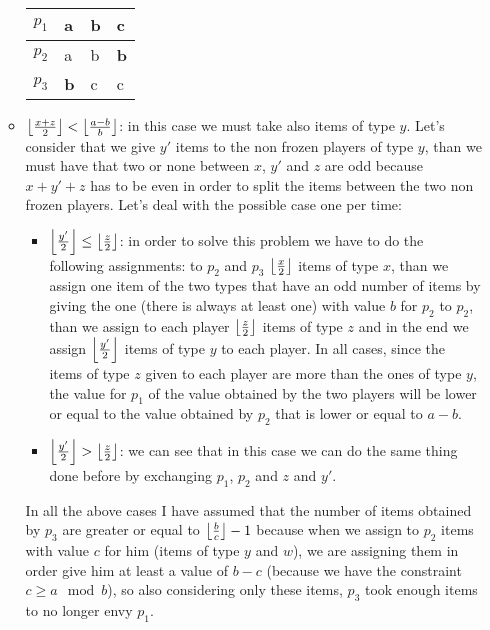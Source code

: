 \begin{itemize}
\begin{itemize}
         \begin{table}[h]
            \centering
                \begin{tabular}{|l|l|l|l|}
                \hline
                $p_1$ & a               & \textbf{b}    & c             \\ \hline
                $p_2$ & a               & b             & \textbf{b}    \\ \hline
                $p_3$ & \textbf{b}      & c             & c             \\ \hline
                \end{tabular}
            \caption{}
            \label{table-3-players-aab-invert-w-lower-second-case-p3p1p2}
        \end{table}
        \item $\left \lfloor\frac{x + z}{2}\right \rfloor < \left \lfloor\frac{a-b}{b}\right \rfloor$: in this case we must take also items of type $y$. Let's consider that we give $y'$ items to the non frozen players of type $y$, than we must have that two or none between $x$, $y'$ and $z$ are odd because $x+y'+z$ has to be even in order to split the items between the two non frozen players. Let's deal with the possible case one per time:
        
        \begin{itemize}
            \item $\left \lfloor\frac{y'}{2}\right \rfloor \le \left \lfloor\frac{z}{2}\right \rfloor$: in order to solve this problem we have to do the following assignments: to $p_2$ and $p_3$ $\left \lfloor\frac{x}{2}\right \rfloor$ items of type $x$, than we assign one item of the two types that have an odd number of items by giving the one (there is always at least one) with value $b$ for $p_2$ to $p_2$, than we assign to each player $\left \lfloor\frac{z}{2}\right \rfloor$ items of type $z$ and in the end we assign $\left \lfloor\frac{y'}{2}\right \rfloor$ items of type $y$ to each player. In all cases, since the items of type $z$ given to each player are more than the ones of type $y$, the value for $p_1$ of the value obtained by the two players will be lower or equal to the value obtained by $p_2$ that is lower or equal to $a-b$.
            \item $\left \lfloor\frac{y'}{2}\right \rfloor > \left \lfloor\frac{z}{2}\right \rfloor$: we can see that in this case we can do the same thing done before by exchanging $p_1$, $p_2$ and $z$ and $y'$.
        \end{itemize}
        In all the above cases I have assumed that the number of items obtained by $p_3$ are greater or equal to $\left \lfloor\frac{b}{c}\right \rfloor -1$ because when we assign to $p_2$ items with value $c$ for him (items of type $y$ and $w$), we are assigning them in order give him at least a value of $b-c$ (because we have the constraint $c\ge a \mod b $), so also considering only these items, $p_3$ took enough items to no longer envy $p_1$.
    \end{itemize}
 
 \end{itemize}
